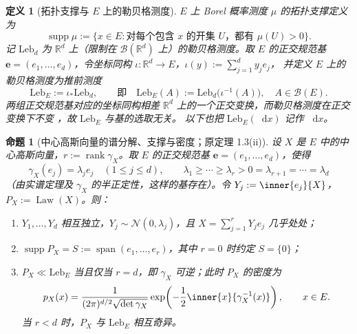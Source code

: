\documentclass[UTF8,11pt,a4paper,oneside,fontset=fandol]{ctexrep}
\numberwithin{equation}{section}
\theoremstyle{zhthm}
\newtheorem{proposition}[theorem]{命题}
\newtheorem{definition}[theorem]{定义}
\newcommand{\R}{\mathbb{R}}
\newcommand{\B}{\mathcal{B}}
\DeclareMathOperator{\Law}{Law}
\DeclareMathOperator{\Span}{span}
\DeclareMathOperator{\supp}{supp}
\DeclareMathOperator{\rank}{rank}
\newcommand{\Leb}{\mathrm{Leb}}
\newcommand{\Normal}{\mathcal{N}}
\newcommand{\dd}{\mathop{}\!\mathrm{d}}
\begin{document}
\begin{definition}[拓扑支撑与 $E$ 上的勒贝格测度]
\label{def:support-euclidean-lebesgue}
$E$ 上 Borel 概率测度 $\mu$ 的拓扑支撑定义为
\[
  \supp\mu:=\bigl\{x\in E:\text{对每个包含 $x$ 的开集 $U$，都有 $\mu(U)>0$}\bigr\}.
\]
记 $\Leb_d$ 为 $\R^d$ 上（限制在 $\B(\R^d)$ 上）的勒贝格测度。取 $E$ 的正交规范基
$\mathbf e=(e_1,\ldots,e_d)$，令坐标同构 $\iota:\R^d\to E$，$\iota(y):=\sum_{j=1}^{d}y_je_j$，
并定义 $E$ 上的勒贝格测度为推前测度
\[
  \Leb_E:=\iota_*\Leb_d,\qquad\text{即}\quad
  \Leb_E(A):=\Leb_d\bigl(\iota^{-1}(A)\bigr),\quad A\in\B(E).
\]
两组正交规范基对应的坐标同构相差 $\R^d$ 上的一个正交变换，而勒贝格测度在正交变换下不变%
\cite[练习 1.2.20--1.2.21，第 41 页]{Tao2011}，故 $\Leb_E$ 与基的选取无关。
以下也把 $\Leb_E(\dd x)$ 记作 $\dd x$。
\end{definition}

\begin{proposition}[中心高斯向量的谱分解、支撑与密度；原定理 1.3(ii)]
\label{prop:gaussian-spectral-support-density}
设 $X$ 是 $E$ 中的中心高斯向量，$r:=\rank\gamma_X$。取 $E$ 的正交规范基
$\mathbf e=(e_1,\ldots,e_d)$，使得
\[
  \gamma_X(e_j)=\lambda_je_j\quad(1\le j\le d),\qquad
  \lambda_1\ge\cdots\ge\lambda_r>0=\lambda_{r+1}=\cdots=\lambda_d
\]
（由实谱定理及 $\gamma_X$ 的半正定性，这样的基存在）。令 $Y_j:=\inner{e_j}{X}$，$P_X:=\Law(X)$。则：
\begin{enumerate}
  \item $Y_1,\ldots,Y_d$ 相互独立，$Y_j\sim\Normal(0,\lambda_j)$，且 $X=\sum_{j=1}^{r}Y_je_j$ 几乎处处；
  \item $\supp P_X=S:=\Span(e_1,\ldots,e_r)$，其中 $r=0$ 时约定 $S=\{0\}$；
  \item $P_X\ll\Leb_E$ 当且仅当 $r=d$，即 $\gamma_X$ 可逆；此时 $P_X$ 的密度为
    \begin{equation}
      \label{eq:gaussian-vector-density}
      p_X(x)=\frac{1}{(2\pi)^{d/2}\sqrt{\det\gamma_X}}
        \exp\!\left(-\frac12\inner{x}{\gamma_X^{-1}(x)}\right),\qquad x\in E.
    \end{equation}
    当 $r<d$ 时，$P_X$ 与 $\Leb_E$ 相互奇异。
\end{enumerate}
\end{proposition}
\end{document}
